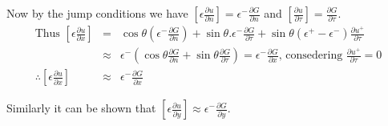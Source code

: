 Now by the jump conditions we have $ \left[\epsilon \frac{\partial u}{\partial n}\right] =\epsilon^- \frac{\partial G}{\partial n}$ and $\left[\frac{\partial u}{\partial \tau}\right]= \frac{\partial G}{\partial \tau}.$
\begin{eqnarray*}
\text{Thus } \left[\epsilon \frac{\partial u}{\partial x}\right] &=& \cos \theta (\epsilon^- \frac{\partial G}{\partial n})+\sin \theta .\epsilon^- \frac{\partial G}{\partial \tau} +\sin \theta (\epsilon^+ -\epsilon^- ) \frac{\partial u^+}{\partial \tau}\\
&\approx & \epsilon^-(\cos \theta  \frac{\partial G}{\partial n}+\sin \theta\frac{\partial G}{\partial \tau}) = \epsilon^- \frac{\partial G}{\partial x}\text{, consedering }\frac{\partial u^+}{\partial \tau}=0\\
\therefore\left[\epsilon \frac{\partial u}{\partial x}\right]&\approx &  \epsilon^- \frac{\partial G}{\partial x}
\end{eqnarray*}

Similarly it can be shown that $\left[\epsilon \frac{\partial u}{\partial y}\right] \approx   \epsilon^- \frac{\partial G}{\partial y}$. 



